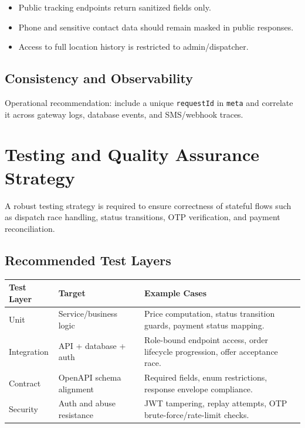 \begin{itemize}
		\item Public tracking endpoints return sanitized fields only.
		\item Phone and sensitive contact data should remain masked in public responses.
		\item Access to full location history is restricted to admin/dispatcher.
\end{itemize}

\subsection{Consistency and Observability}

Operational recommendation:
include a unique \texttt{requestId} in \texttt{meta} and correlate it across
gateway logs, database events, and SMS/webhook traces.

\section{Testing and Quality Assurance Strategy}

A robust testing strategy is required to ensure correctness of stateful flows
such as dispatch race handling, status transitions, OTP verification, and
payment reconciliation.

\subsection{Recommended Test Layers}

\begin{tabularx}{\textwidth}{@{}p{2.5cm}p{4.8cm}X@{}}
\toprule
\textbf{Test Layer} & \textbf{Target} & \textbf{Example Cases} \\
\midrule
Unit & Service/business logic & Price computation, status transition guards, payment status mapping. \\
Integration & API + database + auth & Role-bound endpoint access, order lifecycle progression, offer acceptance race. \\
Contract & OpenAPI schema alignment & Required fields, enum restrictions, response envelope compliance. \\
Security & Auth and abuse resistance & JWT tampering, replay attempts, OTP brute-force/rate-limit checks. \\
\bottomrule
\end{tabularx}

